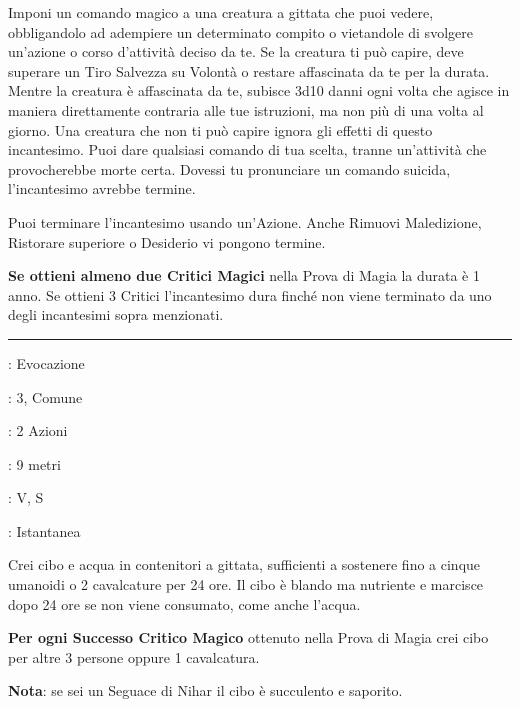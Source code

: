 \begin{multicols}{2}
Imponi un comando magico a una creatura a gittata che puoi vedere, obbligandolo ad adempiere un determinato compito o vietandole di svolgere un'azione o corso d'attività deciso da te. Se la creatura ti può capire, deve superare un Tiro Salvezza su Volontà o restare affascinata da te per la durata. Mentre la creatura è affascinata da te, subisce 3d10 danni ogni volta che agisce in maniera direttamente contraria alle tue istruzioni, ma non più di una volta al giorno. Una creatura che non ti può capire ignora gli effetti di questo incantesimo. Puoi dare qualsiasi comando di tua scelta, tranne un'attività che provocherebbe morte certa. Dovessi tu pronunciare un comando suicida, l'incantesimo avrebbe termine.

Puoi terminare l'incantesimo usando un'Azione. Anche Rimuovi Maledizione, Ristorare superiore o Desiderio vi pongono termine.

\textbf{Se ottieni almeno due Critici Magici} nella Prova di Magia la durata è 1 anno. Se ottieni 3 Critici l'incantesimo dura finché non viene terminato da uno degli incantesimi sopra menzionati.

\smallskip\noindent\rule{\linewidth}{2pt} \hypertarget{Creare Cibo e Acqua}{}\medskip{}
\noindent
\begin{description}[noitemsep, topsep=0pt, parsep=0pt, partopsep=0pt, leftmargin=0cm, labelwidth=2.8cm]
	\item[\textbf{Lista di Magia}]: Evocazione
	\item[\textbf{Livello}]: 3, Comune
	\item[\textbf{T. di Lancio}]: 2 Azioni
	\item[\textbf{Gittata}]: 9 metri
	\item[\textbf{Componenti}]: V, S
	\item[\textbf{Durata}]: Istantanea
\end{description}

Crei cibo e acqua in contenitori a gittata, sufficienti a sostenere fino a cinque umanoidi o 2 cavalcature per 24 ore. Il cibo è blando ma nutriente e marcisce dopo 24 ore se non viene consumato, come anche l'acqua.

\textbf{Per ogni Successo Critico Magico} ottenuto nella Prova di Magia crei cibo per altre 3 persone oppure 1 cavalcatura.

\textbf{Nota}: se sei un Seguace di Nihar il cibo è succulento e saporito.


\end{multicols}
